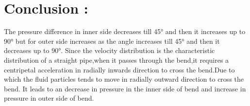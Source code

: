 \documentclass[12pt,a4paper]{article}
\begin{document}
\section{Conclusion :}

 The pressure difference in inner side decreases till 45°  and then it increases up to 90° but for outer side increases as the angle increases till 45° and then it decreases up to 90°. Since the velocity distribution is the characteristic distribution of a straight pipe,when it passes through the bend,it requires a centripetal acceleration in radially inwards direction to cross the bend.Due to which the fluid particles tends to move in radially outward direction to cross the bend. It leads to an decrease in pressure in the inner side of bend and increase in pressure in outer side of bend.
    
\end{document}
